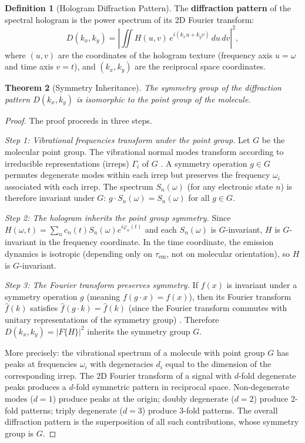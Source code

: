 \documentclass[11pt,a4paper]{article}
\newtheorem{theorem}{Theorem}[section]
\theoremstyle{definition}
\newtheorem{definition}[theorem]{Definition}
\theoremstyle{remark}
\begin{document}
\begin{definition}[Hologram Diffraction Pattern]
\label{def:diffraction}
The \textbf{diffraction pattern} of the spectral hologram is the power spectrum of its 2D Fourier transform:
\begin{equation}
\label{eq:diffraction}
D(k_x, k_y) = \left| \iint H(u, v) \, e^{i(k_x u + k_y v)} \, du \, dv \right|^2,
\end{equation}
where $(u, v)$ are the coordinates of the hologram texture (frequency axis $u = \omega$ and time axis $v = t$), and $(k_x, k_y)$ are the reciprocal space coordinates.
\end{definition}

\begin{theorem}[Symmetry Inheritance]
\label{thm:symmetry}
The symmetry group of the diffraction pattern $D(k_x, k_y)$ is isomorphic to the point group of the molecule.
\end{theorem}

\begin{proof}
The proof proceeds in three steps.

\emph{Step 1: Vibrational frequencies transform under the point group.} Let $G$ be the molecular point group. The vibrational normal modes transform according to irreducible representations (irreps) $\Gamma_i$ of $G$ \citep{cotton1990, wilson1955}. A symmetry operation $g \in G$ permutes degenerate modes within each irrep but preserves the frequency $\omega_i$ associated with each irrep. The spectrum $S_n(\omega)$ (for any electronic state $n$) is therefore invariant under $G$: $g \cdot S_n(\omega) = S_n(\omega)$ for all $g \in G$.

\emph{Step 2: The hologram inherits the point group symmetry.} Since $H(\omega, t) = \sum_n c_n(t) S_n(\omega) e^{i\varphi_n(t)}$ and each $S_n(\omega)$ is $G$-invariant, $H$ is $G$-invariant in the frequency coordinate. In the time coordinate, the emission dynamics is isotropic (depending only on $\tau_{\mathrm{em}}$, not on molecular orientation), so $H$ is $G$-invariant.

\emph{Step 3: The Fourier transform preserves symmetry.} If $f(x)$ is invariant under a symmetry operation $g$ (meaning $f(g \cdot x) = f(x)$), then its Fourier transform $\hat{f}(k)$ satisfies $\hat{f}(g \cdot k) = \hat{f}(k)$ (since the Fourier transform commutes with unitary representations of the symmetry group) \citep{bornwolf1999}. Therefore $D(k_x, k_y) = |F\{H\}|^2$ inherits the symmetry group $G$.

More precisely: the vibrational spectrum of a molecule with point group $G$ has peaks at frequencies $\omega_i$ with degeneracies $d_i$ equal to the dimension of the corresponding irrep. The 2D Fourier transform of a signal with $d$-fold degenerate peaks produces a $d$-fold symmetric pattern in reciprocal space. Non-degenerate modes ($d=1$) produce peaks at the origin; doubly degenerate ($d=2$) produce 2-fold patterns; triply degenerate ($d=3$) produce 3-fold patterns. The overall diffraction pattern is the superposition of all such contributions, whose symmetry group is $G$.
\end{proof}
\end{document}
